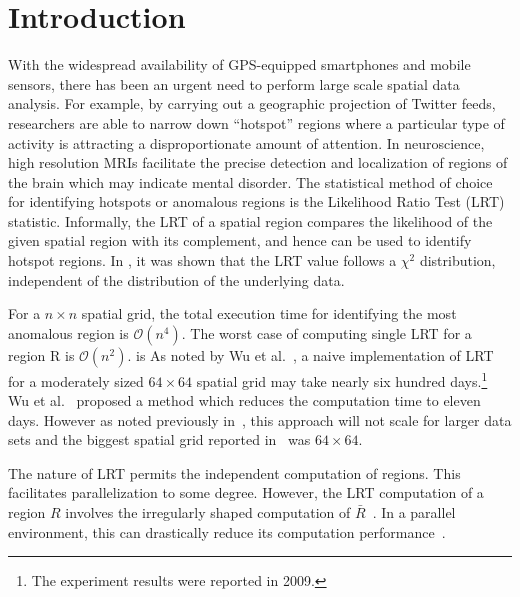 \documentclass[10pt,journal,cspaper,compsoc]{IEEEtran}
\newcommand\bigo{\mathcal O}
\begin{document}
\IEEEdisplaynotcompsoctitleabstractindextext

\IEEEpeerreviewmaketitle

\section{Introduction}

With the widespread availability of GPS-equipped smartphones and mobile
sensors, there has been an urgent need to perform large scale spatial data analysis.
For example, by carrying
out a geographic projection of Twitter feeds, researchers are able to
narrow down ``hotspot'' regions where a particular type of activity is attracting a disproportionate  amount of attention. In neuroscience, high resolution MRIs facilitate the precise detection and localization of regions of the brain which may indicate mental disorder.
The statistical method of choice for identifying hotspots or anomalous regions
is the Likelihood Ratio Test (LRT) statistic.
Informally, the LRT of a spatial region compares the likelihood of the given spatial region with its complement, and hence can be used to identify hotspot regions. In \cite{chisquare}, it was shown that the LRT value follows a $\chi^{2}$ distribution, independent of the distribution of the underlying data.

For a $n\times n$ spatial grid, the total execution time for identifying the most
anomalous region is $\bigo(n^4)$. The worst case of computing
single LRT for a region R is $\bigo(n^2)$. is As noted by Wu et al.~\cite{jour}, a naive implementation of LRT for a moderately sized $64 \times 64$  spatial grid may take nearly six hundred days.\footnote{The experiment results were  reported in  2009.} Wu et al.~\cite{jour} proposed a method which reduces the computation time to eleven days. However as noted previously in~\cite{ADMA}, this approach will not scale for larger data sets and the biggest spatial grid reported in~\cite{jour} was $64 \times  64$.


\noindent The nature of LRT permits the independent computation of regions. This facilitates parallelization to some degree. However, the LRT computation of a region $R$ involves the irregularly shaped computation of $\bar R$~\cite{apweb}. In a parallel environment, this can drastically reduce its computation performance~\cite{irregular1,irregular2,irregular3}.
\end{document}
